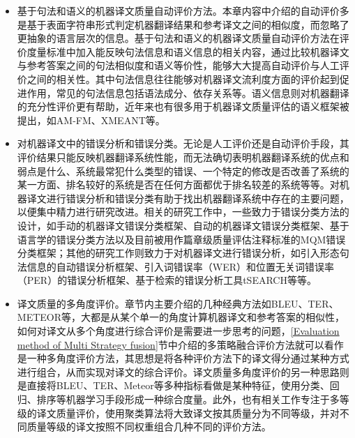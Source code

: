 \begin{itemize}
\vspace{0.5em}
\item 基于句法和语义的机器译文质量自动评价方法。本章内容中介绍的自动评价多是基于表面字符串形式判定机器翻译结果和参考译文之间的相似度，而忽略了更抽象的语言层次的信息。基于句法和语义的机器译文质量自动评价方法在评价度量标准中加入能反映句法信息和语义信息的相关内容，通过比较机器译文与参考答案之间的句法相似度和语义等价性，能够大大提高自动评价与人工评价之间的相关性。其中句法信息往往能够对机器译文流利度方面的评价起到促进作用，常见的句法信息包括语法成分、依存关系等。语义信息则对机器翻译的充分性评价更有帮助，近年来也有很多用于机器译文质量评估的语义框架被提出，如AM-FM、XMEANT等。
\vspace{0.5em}
\item 对机器译文中的错误分析和错误分类。无论是人工评价还是自动评价手段，其评价结果只能反映机器翻译系统性能，而无法确切表明机器翻译系统的优点和弱点是什么、系统最常犯什么类型的错误、一个特定的修改是否改善了系统的某一方面、排名较好的系统是否在任何方面都优于排名较差的系统等等。对机器译文进行错误分析和错误分类有助于找出机器翻译系统中存在的主要问题，以便集中精力进行研究改进。相关的研究工作中，一些致力于错误分类方法的设计，如手动的机器译文错误分类框架、自动的机器译文错误分类框架、基于语言学的错误分类方法以及目前被用作篇章级质量评估注释标准的MQM错误分类框架；其他的研究工作则致力于对机器译文进行错误分析，如引入形态句法信息的自动错误分析框架、引入词错误率（WER）和位置无关词错误率（PER）的错误分析框架、基于检索的错误分析工具tSEARCH等等。
\vspace{0.5em}
\item 译文质量的多角度评价。章节内主要介绍的几种经典方法如BLEU、TER、METEOR等，大都是从某个单一的角度计算机器译文和参考答案的相似性，如何对译文从多个角度进行综合评价是需要进一步思考的问题，\ref{Evaluation method of Multi Strategy fusion}节中介绍的多策略融合评价方法就可以看作是一种多角度评价方法，其思想是将各种评价方法下的译文得分通过某种方式进行组合，从而实现对译文的综合评价。译文质量多角度评价的另一种思路则是直接将BLEU、TER、Meteor等多种指标看做是某种特征，使用分类、回归、排序等机器学习手段形成一种综合度量。此外，也有相关工作专注于多等级的译文质量评价，使用聚类算法将大致译文按其质量分为不同等级，并对不同质量等级的译文按照不同权重组合几种不同的评价方法。

\end{itemize}
